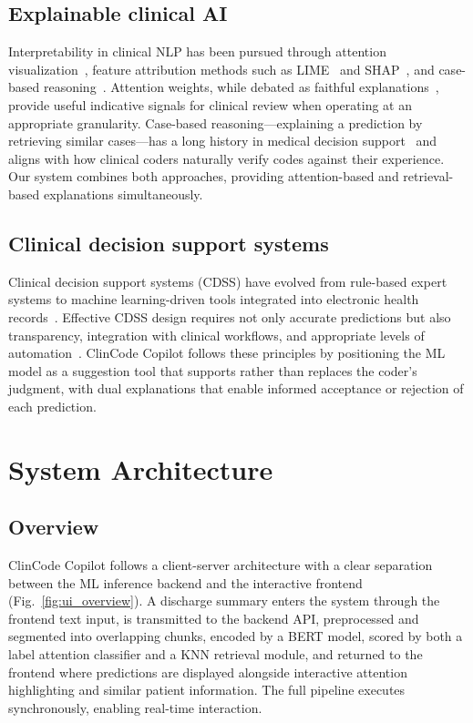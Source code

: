 \documentclass[conference]{IEEEtran}
\begin{document}
\subsection{Explainable clinical AI}

Interpretability in clinical NLP has been pursued through attention visualization~\cite{b_mullenbach2018, b_vu2020}, feature attribution methods such as LIME~\cite{b_lime} and SHAP~\cite{b_shap}, and case-based reasoning~\cite{b_kolodner1992}. Attention weights, while debated as faithful explanations~\cite{b_jain2019, b_wiegreffe2019}, provide useful indicative signals for clinical review when operating at an appropriate granularity. Case-based reasoning---explaining a prediction by retrieving similar cases---has a long history in medical decision support~\cite{b_bichindaritz2006} and aligns with how clinical coders naturally verify codes against their experience. Our system combines both approaches, providing attention-based and retrieval-based explanations simultaneously.

\subsection{Clinical decision support systems}

Clinical decision support systems (CDSS) have evolved from rule-based expert systems to machine learning-driven tools integrated into electronic health records~\cite{b_sutton2020}. Effective CDSS design requires not only accurate predictions but also transparency, integration with clinical workflows, and appropriate levels of automation~\cite{b_sittig2020}. ClinCode Copilot follows these principles by positioning the ML model as a suggestion tool that supports rather than replaces the coder's judgment, with dual explanations that enable informed acceptance or rejection of each prediction.

\section{System Architecture}

\subsection{Overview}

ClinCode Copilot follows a client-server architecture with a clear separation between the ML inference backend and the interactive frontend (Fig.~\ref{fig:ui_overview}). A discharge summary enters the system through the frontend text input, is transmitted to the backend API, preprocessed and segmented into overlapping chunks, encoded by a BERT model, scored by both a label attention classifier and a KNN retrieval module, and returned to the frontend where predictions are displayed alongside interactive attention highlighting and similar patient information. The full pipeline executes synchronously, enabling real-time interaction.
\end{document}
